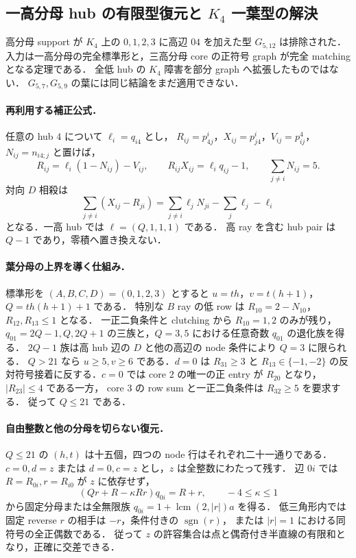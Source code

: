 \subsection{一高分母 hub の有限型復元と \texorpdfstring{$K_4$}{K4} 一葉型の解決}
\label{nl18:leaf-hub}

高分母 support が $K_4$ 上の $0,1,2,3$ に高辺 $04$ を加えた型 $G_{5,12}$ は排除された．
入力は一高分母の完全標準形と，三高分母 core の正符号 graph が完全 matching となる定理である．
全低 hub の $K_4$ 障害を部分 graph へ拡張したものではない．
$G_{5,7},G_{5,9}$ の葉には同じ結論をまだ適用できない．

\paragraph{再利用する補正公式．}
任意の hub $4$ について $\ell_i=q_{i4}$ とし，
$R_{ij}=p^i_{4j}$，$X_{ij}=p^i_{j4}$，$V_{ij}=p^4_{ij}$，$N_{ij}=n_{i4;j}$ と置けば，
\[
 R_{ij}=\ell_i(1-N_{ij})-V_{ij},\qquad
 R_{ij}X_{ij}=\ell_iq_{ij}-1,\qquad
 \sum_{j\ne i}N_{ij}=5.
\]
対向 $D$ 相殺は
\[
 \sum_{j\ne i}(X_{ij}-R_{ji})
 =\sum_{j\ne i}\ell_jN_{ji}-\sum_j\ell_j-\ell_i
\]
となる．一高 hub では $\ell=(Q,1,1,1)$ である．
高 ray を含む hub pair は $Q-1$ であり，零積へ置き換えない．

\paragraph{葉分母の上界を導く仕組み．}
標準形を $(A,B,C,D)=(0,1,2,3)$ とすると
$u=th$，$v=t(h+1)$，$Q=th(h+1)+1$ である．
特別な $B$ ray の低 row は $R_{10}=2-N_{10}$，$R_{12},R_{13}\le1$ となる．
一正二負条件と clutching から $R_{10}=1,2$ のみが残り，
$q_{01}=2Q-1,Q,2Q+1$ の三族と，$Q=3,5$ における任意奇数 $q_{01}$ の退化族を得る．
$2Q-1$ 族は高 hub 辺の $D$ と他の高辺の node 条件により $Q=3$ に限られる．
$Q>21$ なら $u\ge5,v\ge6$ である．$d=0$ は $R_{31}\ge3$ と
$R_{13}\in\{-1,-2\}$ の反対符号接着に反する．$c=0$ では
core $2$ の唯一の正 entry が $R_{20}$ となり，$|R_{23}|\le4$ である一方，
core $3$ の row sum と一正二負条件は $R_{32}\ge5$ を要求する．
従って $Q\le21$ である．

\paragraph{自由整数と他の分母を切らない復元．}
$Q\le21$ の $(h,t)$ は十五個，四つの node 行はそれぞれ二十一通りである．
$c=0,d=z$ または $d=0,c=z$ とし，$z$ は全整数にわたって残す．
辺 $0i$ では $R=R_{0i},r=R_{i0}$ が $z$ に依存せず，
\[
 (Qr+R-\kappa Rr)q_{0i}=R+r,\qquad -4\le\kappa\le1
\]
から固定分母または全無限族 $q_{0i}=1+\operatorname{lcm}(2,|r|)a$ を得る．
低三角形内では固定 reverse $r$ の相手は $-r$，条件付きの $\operatorname{sgn}(r)$，
または $|r|=1$ における同符号の全正偶数である．
従って $z$ の許容集合は点と偶奇付き半直線の有限和となり，正確に交差できる．

